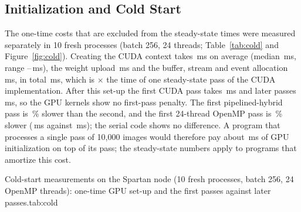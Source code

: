 \subsection{Initialization and Cold Start}\label{sec:cold}

The one-time costs that are excluded from the steady-state times were measured separately in 10 fresh processes (batch 256, 24 threads; Table~\ref{tab:cold} and Figure~\ref{fig:cold}). Creating the CUDA context takes \,ms on average (median \,ms, range --\,ms), the weight upload \,ms and the buffer, stream and event allocation \,ms, in total \,ms, which is $\times$ the time of one steady-state pass of the CUDA implementation. After this set-up the first CUDA pass takes \,ms and later passes \,ms, so the GPU kernels show no first-pass penalty. The first pipelined-hybrid pass is \,\% slower than the second, and the first 24-thread OpenMP pass is \,\% slower (\,ms against \,ms); the serial code shows no difference. A program that processes a single pass of 10{,}000 images would therefore pay about \,ms of GPU initialization on top of its pass; the steady-state numbers apply to programs that amortize this cost.


\begin{widetable}{Cold-start measurements on the Spartan node (10 fresh processes, batch 256, 24 OpenMP threads): one-time GPU set-up and the first passes against later passes.}{tab:cold}

\end{widetable}

